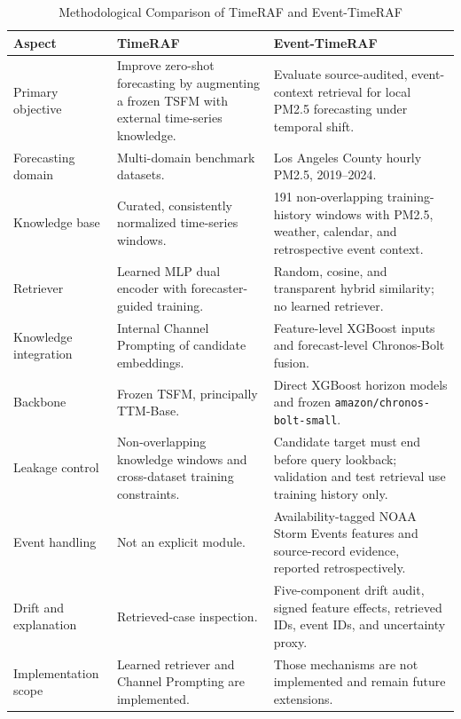 \begin{table}[!t]
\centering
\caption{Methodological Comparison of TimeRAF and Event-TimeRAF}
\label{tab:timeraf_comparison}
\begin{tabular}{p{}p{}p{}}
\toprule
Aspect & TimeRAF & Event-TimeRAF \\
\midrule
Primary objective & Improve zero-shot forecasting by augmenting a frozen TSFM
with external time-series knowledge. & Evaluate source-audited, event-context
retrieval for local PM2.5 forecasting under temporal shift. \\
Forecasting domain & Multi-domain benchmark datasets. & Los Angeles County
hourly PM2.5, 2019--2024. \\
Knowledge base & Curated, consistently normalized time-series windows. & 191
non-overlapping training-history windows with PM2.5, weather, calendar, and
retrospective event context. \\
Retriever & Learned MLP dual encoder with forecaster-guided training. & Random,
cosine, and transparent hybrid similarity; no learned retriever. \\
Knowledge integration & Internal Channel Prompting of candidate embeddings. &
Feature-level XGBoost inputs and forecast-level Chronos-Bolt fusion. \\
Backbone & Frozen TSFM, principally TTM-Base. & Direct XGBoost horizon models
and frozen \texttt{amazon/chronos-bolt-small}. \\
Leakage control & Non-overlapping knowledge windows and cross-dataset training
constraints. & Candidate target must end before query lookback; validation and
test retrieval use training history only. \\
Event handling & Not an explicit module. & Availability-tagged NOAA Storm
Events features and source-record evidence, reported retrospectively. \\
Drift and explanation & Retrieved-case inspection. & Five-component drift
audit, signed feature effects, retrieved IDs, event IDs, and uncertainty proxy. \\
Implementation scope & Learned retriever and Channel Prompting are implemented.
& Those mechanisms are not implemented and remain future extensions. \\
\bottomrule
\end{tabular}
\end{table}
